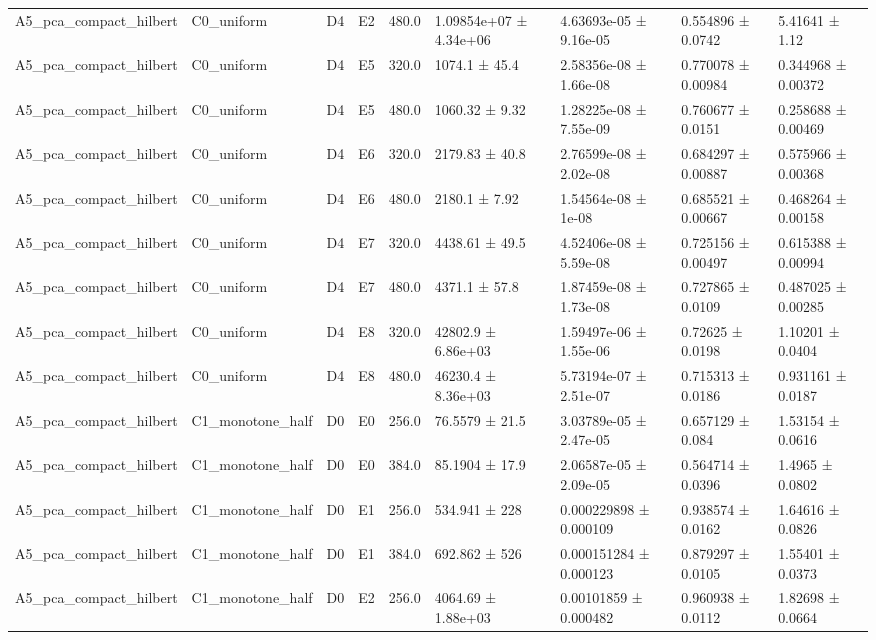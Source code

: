 \begin{table}
\begin{tabular}{lllllllll}
A5\_pca\_compact\_hilbert & C0\_uniform & D4 & E2 & 480.0 & 1.09854e+07 ± 4.34e+06 & 4.63693e-05 ± 9.16e-05 & 0.554896 ± 0.0742 & 5.41641 ± 1.12 \\
A5\_pca\_compact\_hilbert & C0\_uniform & D4 & E5 & 320.0 & 1074.1 ± 45.4 & 2.58356e-08 ± 1.66e-08 & 0.770078 ± 0.00984 & 0.344968 ± 0.00372 \\
A5\_pca\_compact\_hilbert & C0\_uniform & D4 & E5 & 480.0 & 1060.32 ± 9.32 & 1.28225e-08 ± 7.55e-09 & 0.760677 ± 0.0151 & 0.258688 ± 0.00469 \\
A5\_pca\_compact\_hilbert & C0\_uniform & D4 & E6 & 320.0 & 2179.83 ± 40.8 & 2.76599e-08 ± 2.02e-08 & 0.684297 ± 0.00887 & 0.575966 ± 0.00368 \\
A5\_pca\_compact\_hilbert & C0\_uniform & D4 & E6 & 480.0 & 2180.1 ± 7.92 & 1.54564e-08 ± 1e-08 & 0.685521 ± 0.00667 & 0.468264 ± 0.00158 \\
A5\_pca\_compact\_hilbert & C0\_uniform & D4 & E7 & 320.0 & 4438.61 ± 49.5 & 4.52406e-08 ± 5.59e-08 & 0.725156 ± 0.00497 & 0.615388 ± 0.00994 \\
A5\_pca\_compact\_hilbert & C0\_uniform & D4 & E7 & 480.0 & 4371.1 ± 57.8 & 1.87459e-08 ± 1.73e-08 & 0.727865 ± 0.0109 & 0.487025 ± 0.00285 \\
A5\_pca\_compact\_hilbert & C0\_uniform & D4 & E8 & 320.0 & 42802.9 ± 6.86e+03 & 1.59497e-06 ± 1.55e-06 & 0.72625 ± 0.0198 & 1.10201 ± 0.0404 \\
A5\_pca\_compact\_hilbert & C0\_uniform & D4 & E8 & 480.0 & 46230.4 ± 8.36e+03 & 5.73194e-07 ± 2.51e-07 & 0.715313 ± 0.0186 & 0.931161 ± 0.0187 \\
A5\_pca\_compact\_hilbert & C1\_monotone\_half & D0 & E0 & 256.0 & 76.5579 ± 21.5 & 3.03789e-05 ± 2.47e-05 & 0.657129 ± 0.084 & 1.53154 ± 0.0616 \\
A5\_pca\_compact\_hilbert & C1\_monotone\_half & D0 & E0 & 384.0 & 85.1904 ± 17.9 & 2.06587e-05 ± 2.09e-05 & 0.564714 ± 0.0396 & 1.4965 ± 0.0802 \\
A5\_pca\_compact\_hilbert & C1\_monotone\_half & D0 & E1 & 256.0 & 534.941 ± 228 & 0.000229898 ± 0.000109 & 0.938574 ± 0.0162 & 1.64616 ± 0.0826 \\
A5\_pca\_compact\_hilbert & C1\_monotone\_half & D0 & E1 & 384.0 & 692.862 ± 526 & 0.000151284 ± 0.000123 & 0.879297 ± 0.0105 & 1.55401 ± 0.0373 \\
A5\_pca\_compact\_hilbert & C1\_monotone\_half & D0 & E2 & 256.0 & 4064.69 ± 1.88e+03 & 0.00101859 ± 0.000482 & 0.960938 ± 0.0112 & 1.82698 ± 0.0664 \\

\end{tabular}
\end{table}
